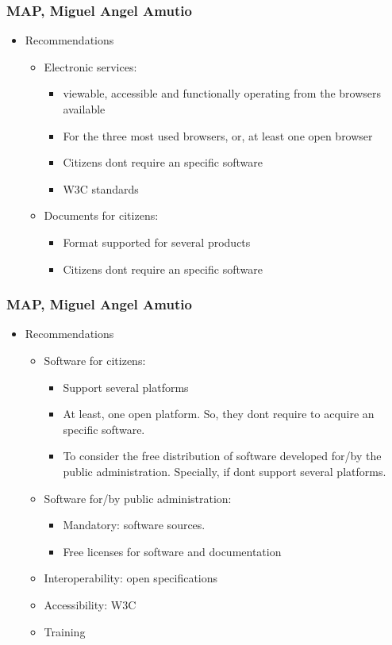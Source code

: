 \documentclass{beamer}
\begin{document}
\begin{frame}
\frametitle{MAP, Miguel Angel Amutio}

\begin{itemize}
\item Recommendations
\begin{itemize}
	\item Electronic services:
	\begin {itemize}
		\item viewable, accessible and functionally operating from the browsers available
		\item For the three most used browsers, or, at least one open browser
		\item Citizens dont require an specific software
		\item W3C standards
	\end {itemize}
	\item Documents for citizens:
	\begin{itemize}
		\item Format supported for several products
		\item Citizens dont require an specific software
	\end{itemize}
\end{itemize}
\end{itemize}

\end{frame}



\begin{frame}
\frametitle{MAP, Miguel Angel Amutio}

\begin{itemize}
\item Recommendations
\begin{itemize}
	\item Software for citizens:
	\begin {itemize}
		\item Support several platforms
		\item At least, one open platform. So, they dont require to acquire an specific software. 
		\item To consider the free distribution of software developed for/by the public administration. Specially, if dont support several platforms. 
	\end{itemize}
	\item Software for/by public administration:
	\begin {itemize}
		\item Mandatory: software sources.
		\item Free licenses for software and documentation
	\end{itemize}
	\item Interoperability: open specifications
	\item Accessibility: W3C
	\item Training 
\end{itemize}
\end{itemize}

\end{frame}
\end{document}
